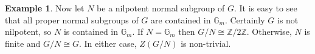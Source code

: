 \documentclass[twoside,a4paper,reqno,11pt]{amsart}
\newcommand{\Z}{\mathbb{Z}}
\newcommand{\Gm}{{\mathbb G}_m}
\theoremstyle{definition}
\newtheorem{example}[theorem]{Example}
\begin{document}
\begin{example}
\vspace{2mm}\noindent Now let $N$ be a nilpotent normal subgroup of $G$. It is easy to see that all proper normal subgroups of $G$ are contained in $\mathbb{G}_m$. %
Certainly $G$ is not nilpotent, so $N$ is contained in $\mathbb{G}_m$. If $N=\mathbb{G}_m$ then $G/N\cong\mathbb{Z}/2\mathbb{Z}$. Otherwise, $N$ is finite and $G/N\cong G$. In either case, $Z(G/N)$ is non-trivial.
\end{example} %
\end{document}
